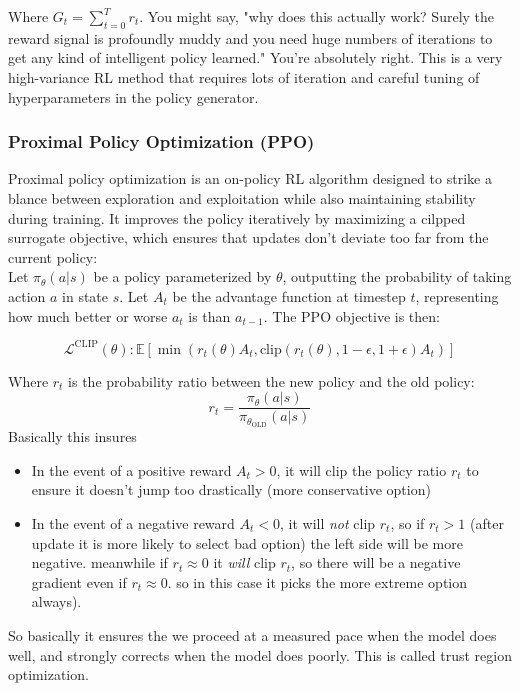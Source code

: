 \documentclass[12pt]{article}
\begin{document}
Where \(G_t = \sum_{t=0}^Tr_t\). You might say, "why does this actually work? Surely the reward signal is profoundly muddy and you need huge numbers of iterations to get any kind of intelligent policy learned." You're absolutely right.  This is a very high-variance RL method that requires lots of iteration and careful tuning of hyperparameters in the policy generator.
\subsubsection{Proximal Policy Optimization (PPO)}
Proximal policy optimization is an on-policy RL algorithm designed to strike a blance between exploration and exploitation while also maintaining stability during training. It improves the policy iteratively by maximizing a cilpped surrogate objective, which ensures that updates don't deviate too far from the current policy:\\

Let \(\pi_\theta(a|s)\) be a policy parameterized by \(\theta\), outputting the probability of taking action \(a\) in state \(s\). Let \(A_t\) be the advantage function at timestep \(t\), representing how much better or worse \(a_t\) is than \(a_{t-1}\). The PPO objective is then:

\[\mathcal{L}^{\text{CLIP}}(\theta): \mathbb{E}\left[\min (r_t(\theta)A_t, \text{clip}(r_t(\theta), 1 - \epsilon, 1+\epsilon)A_t)\right]\]

Where \(r_t\) is the probability ratio between the new policy and the old policy:
\[r_t = \frac{\pi_\theta(a|s)}{\pi_{\theta_{\text{OLD}}}(a|s)}\]
Basically this insures 
\begin{itemize}
\item In the event of a positive reward \(A_t > 0\), it will clip the policy ratio \(r_t\) to ensure it doesn't jump too drastically (more conservative option)
\item In the event of a negative reward \(A_t < 0\), it will \emph{not} clip \(r_t\), so if \(r_t > 1\) (after update it is more likely to select bad option) the left side will be more negative. meanwhile if \(r_t \approx 0\) it \emph{will} clip \(r_t\), so there will be a negative gradient even if \(r_t \approx 0\). so in this case it picks the more extreme option always).
\end{itemize}

So basically it ensures the we proceed at a measured pace when the model does well, and strongly corrects when the model does poorly. This is called trust region optimization. \\
\end{document}
